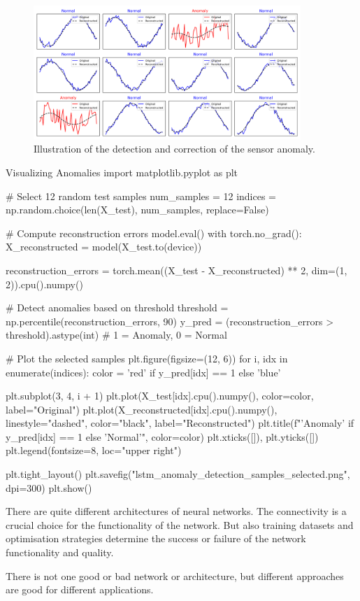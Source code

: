 \begin{figure}[ht!]
    \centering
    \includegraphics[width=0.9\textwidth]{images/lstm_anomaly_detection_samples_selected.png}
    \caption{Illustration of the detection and correction of the sensor anomaly.}
    \label{fig:training_loss}
\end{figure}


\begin{codeonly}{Visualizing Anomalies}
import matplotlib.pyplot as plt

# Select 12 random test samples
num_samples = 12
indices = np.random.choice(len(X_test), num_samples, replace=False)

# Compute reconstruction errors
model.eval()
with torch.no_grad():
    X_reconstructed = model(X_test.to(device))

reconstruction_errors = torch.mean((X_test - X_reconstructed) ** 2, dim=(1, 2)).cpu().numpy()

# Detect anomalies based on threshold
threshold = np.percentile(reconstruction_errors, 90)
y_pred = (reconstruction_errors > threshold).astype(int)  # 1 = Anomaly, 0 = Normal

# Plot the selected samples
plt.figure(figsize=(12, 6))
for i, idx in enumerate(indices):
    color = 'red' if y_pred[idx] == 1 else 'blue'
    
    plt.subplot(3, 4, i + 1)
    plt.plot(X_test[idx].cpu().numpy(), color=color, label="Original")
    plt.plot(X_reconstructed[idx].cpu().numpy(), linestyle="dashed", color="black", label="Reconstructed")
    plt.title(f"{'Anomaly' if y_pred[idx] == 1 else 'Normal'}", color=color)
    plt.xticks([]), plt.yticks([])
    plt.legend(fontsize=8, loc="upper right")

plt.tight_layout()
plt.savefig("lstm_anomaly_detection_samples_selected.png", dpi=300)
plt.show()
\end{codeonly}

\begin{recommendationbox}
There are quite different architectures of neural networks. The connectivity is a crucial choice for the functionality of the network. But also training datasets and optimisation strategies determine the success or failure of the network functionality and quality. 
\end{recommendationbox}

\begin{recommendationbox}
There is not one good or bad network or architecture, but different approaches are good for different applications. 
\end{recommendationbox}
